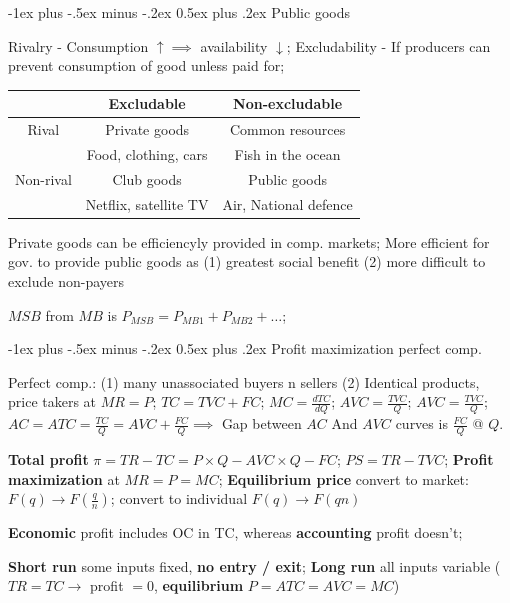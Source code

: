 \documentclass[a4paper]{article}
\makeatletter
\renewcommand{\section}{\@startsection{section}{1}{0mm}%
                                {-1ex plus -.5ex minus -.2ex}%
                                {0.5ex plus .2ex}%
                                {\normalfont\small\bfseries}}
\makeatother
\begin{document}
\begin{multicols*}{3}
        \section{Public goods}

        Rivalry - Consumption $\uparrow \implies$ availability $\downarrow$; Excludability - If producers can prevent consumption of good unless paid for;

        \begin{tabular}{|c|c|c|}
            \hline
                      & Excludable            & Non-excludable        \\ \hline
            Rival     & Private goods         & Common resources      \\
                      & Food, clothing, cars  & Fish in the ocean     \\ \hline
            Non-rival & Club goods            & Public goods          \\
                      & Netflix, satellite TV & Air, National defence \\ \hline
        \end{tabular}
        Private goods can be efficiencyly provided in comp. markets; More efficient for gov. to provide public goods as (1) greatest social benefit (2) more difficult to exclude non-payers

    $MSB$ from $MB$ is $P_{MSB} = P_{MB1} + P_{MB2} + \ldots$;

        \section{Profit maximization perfect comp.}

        Perfect comp.: (1) many unassociated buyers n sellers (2) Identical products, price takers at $MR=P$; $TC = TVC + FC$; $MC = \frac{dTC}{dQ}$; $AVC = \frac{TVC}{Q}$; $AVC = \frac{TVC}{Q}$; $AC = ATC = \frac{TC}{Q} = AVC + \frac{FC}{Q} \implies $ Gap between $AC$ And $AVC$ curves is $\frac{FC}{Q}$ @ $Q$.

        \textbf{Total profit} $\pi = TR-TC = P\times Q - AVC \times Q - FC$; $PS = TR - TVC$; \textbf{Profit maximization} at $MR=P=MC$; \textbf{Equilibrium price} convert to market: $F(q) \to F(\frac{q}{n})$; convert to individual $F(q) \to F(qn)$

        \textbf{Economic} profit includes OC in TC, whereas \textbf{accounting} profit doesn't;

        \textbf{Short run} some inputs fixed, \textbf{no entry / exit}; \textbf{Long run} all inputs variable ($TR=TC \to$ profit $= 0$, \textbf{equilibrium }$P=ATC=AVC=MC$)


\end{multicols*}
\end{document}
